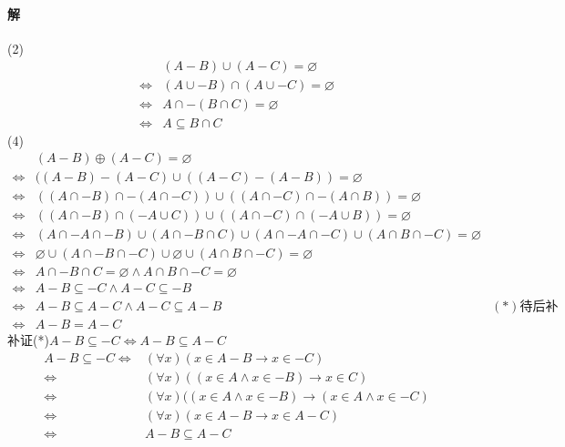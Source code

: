 \documentclass[UTF8]{ctexart}
\begin{document}
\paragraph{解}
(2)
\begin{align*}
     & (A-B) \cup (A-C) = \varnothing \\
    \Longleftrightarrow & (A \cup -B) \cap (A \cup -C) = \varnothing \\
    \Longleftrightarrow & A \cap -(B \cap C) = \varnothing \\
    \Longleftrightarrow & A\subseteq B \cap C
\end{align*}
(4)
\begin{align*}
    & (A-B) \oplus (A-C) = \varnothing \\
    \Longleftrightarrow & ((A-B)-(A-C) \cup ((A-C)-(A-B)) = \varnothing \\
    \Longleftrightarrow & ((A \cap -B) \cap -(A \cap -C)) \cup ((A \cap -C) \cap -(A \cap B)) = \varnothing \\
    \Longleftrightarrow & ((A \cap -B) \cap (-A \cup C)) \cup ((A \cap -C) \cap (-A \cup B)) = \varnothing \\
    \Longleftrightarrow & (A \cap -A \cap -B) \cup (A \cap -B \cap C) \cup (A \cap -A \cap -C) \cup (A \cap B \cap -C) = \varnothing \\
    \Longleftrightarrow & \varnothing \cup (A \cap -B \cap -C) \cup \varnothing \cup (A \cap B \cap -C) = \varnothing \\
    \Longleftrightarrow & A \cap -B \cap C = \varnothing \land A \cap B \cap -C = \varnothing \\
    \Longleftrightarrow & A-B\subseteq -C \land A-C\subseteq -B \\
    \Longleftrightarrow & A-B\subseteq A-C \land A-C\subseteq A-B & (\ast)\text{待后补证} \\
    \Longleftrightarrow & A-B = A-C
\end{align*}
补证(*)$A-B\subseteq -C \Longleftrightarrow A-B\subseteq A-C$
\begin{align*}
    A-B\subseteq -C 
    \Longleftrightarrow & ( \forall x) (x \in A-B \rightarrow x \in -C) \\
    \Longleftrightarrow & ( \forall x)((x \in A \land x \in -B) \rightarrow x \in C) \\
    \Longleftrightarrow & ( \forall x)((x \in A \land x \in -B) \rightarrow (x \in A \land x \in -C) \\
    \Longleftrightarrow & ( \forall x)(x \in A-B \rightarrow x \in A-C) \\
    \Longleftrightarrow & A-B\subseteq A-C
\end{align*}
\end{document}
